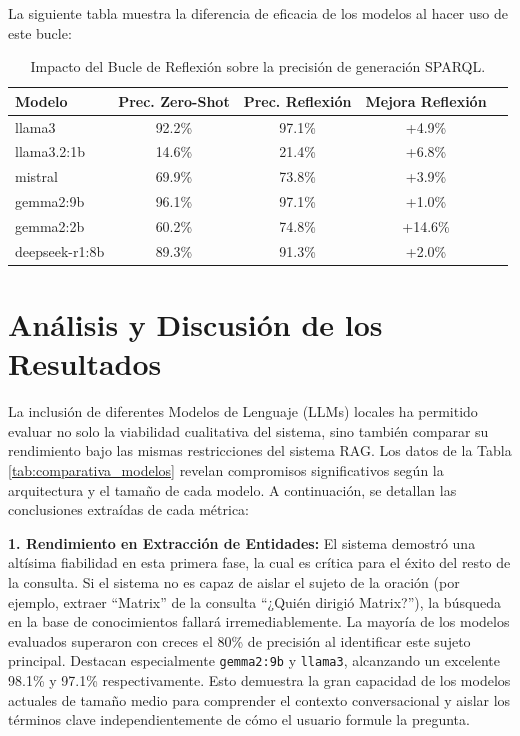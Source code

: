 La siguiente tabla muestra la diferencia de eficacia de los modelos al hacer uso de este bucle: 

\begin{table}[h]
    \centering
    \begin{tabular}{|l|c|c|c|c|}
        \hline
        \textbf{Modelo}& \textbf{Prec. Zero-Shot} & \textbf{Prec. Reflexión} & \textbf{Mejora Reflexión} \\ \hline
        llama3         & 92.2\%                   & 97.1\%                   & +4.9\%                    \\ \hline
        llama3.2:1b    & 14.6\%                   & 21.4\%                    & +6.8\%                   \\ \hline
        mistral        & 69.9\%                   & 73.8\%                   & +3.9\%                    \\ \hline
        gemma2:9b      & 96.1\%                   & 97.1\%                   & +1.0\%                   \\ \hline
        gemma2:2b      & 60.2\%                   & 74.8\%                   & +14.6\%                    \\ \hline
        deepseek-r1:8b & 89.3\%                   & 91.3\%                   & +2.0\%                   \\ \hline
    \end{tabular}
    \vspace{0.2cm}
    \caption{Impacto del Bucle de Reflexión sobre la precisión de generación SPARQL.}
    \label{tab:impacto}
\end{table}

\section{Análisis y Discusión de los Resultados}

La inclusión de diferentes Modelos de Lenguaje (LLMs) locales ha permitido evaluar no solo la viabilidad cualitativa del sistema, sino también comparar su rendimiento bajo las mismas restricciones del sistema RAG. Los datos de la Tabla \ref{tab:comparativa_modelos} revelan compromisos significativos según la arquitectura y el tamaño de cada modelo. A continuación, se detallan las conclusiones extraídas de cada métrica:

\textbf{1. Rendimiento en Extracción de Entidades:} El sistema demostró una altísima fiabilidad en esta primera fase, la cual es crítica para el éxito del resto de la consulta. Si el sistema no es capaz de aislar el sujeto de la oración (por ejemplo, extraer ``Matrix'' de la consulta ``¿Quién dirigió Matrix?''), la búsqueda en la base de conocimientos fallará irremediablemente. La mayoría de los modelos evaluados superaron con creces el 80\% de precisión al identificar este sujeto principal. Destacan especialmente \texttt{gemma2:9b} y \texttt{llama3}, alcanzando un excelente 98.1\% y 97.1\% respectivamente. Esto demuestra la gran capacidad de los modelos actuales de tamaño medio para comprender el contexto conversacional y aislar los términos clave independientemente de cómo el usuario formule la pregunta.

